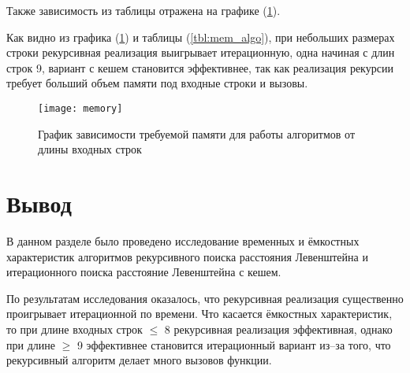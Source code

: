 Также зависимость из таблицы отражена на графике (\ref{fig:mem_graph}).

Как видно из графика (\ref{fig:mem_graph}) и таблицы (\ref{tbl:mem_algo}), при небольших размерах строки рекурсивная реализация выигрывает итерационную, одна начиная с длин строк 9, вариант с кешем становится эффективнее, так как реализация рекурсии требует больший объем памяти под входные строки и вызовы.
\begin{figure}
	\centering
	\texttt{[image: memory]}
	\caption{График зависимости требуемой памяти для работы алгоритмов от длины входных строк}
	\label{fig:mem_graph}
\end{figure}

\pagebreak

\section{Вывод}

В данном разделе было проведено исследование временных и ёмкостных характеристик алгоритмов рекурсивного поиска расстояния Левенштейна и итерационного поиска расстояние Левенштейна с кешем.

По результатам исследования оказалось, что рекурсивная реализация существенно проигрывает итерационной по времени. Что касается ёмкостных характеристик, то при длине входных строк $\leq$ 8 рекурсивная реализация эффективная, однако при длине $\geq$ 9 эффективнее становится итерационный вариант из–за того, что рекурсивный алгоритм делает много вызовов функции.

\clearpage
